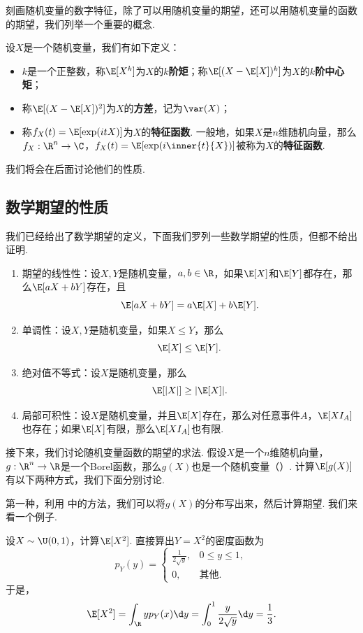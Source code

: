 刻画随机变量的数字特征，除了可以用随机变量的期望，还可以用随机变量的函数的期望，我们列举一个重要的概念. 

\begin{definition}[矩，方差，特征函数]
设$X$是一个随机变量，我们有如下定义：
\begin{itemize}
    \item $k$是一个正整数，称$\E[X^k]$为$X$的\textbf{$k$阶矩}；称$\E[(X-\E[X])^k]$为$X$的\textbf{$k$阶中心矩}；
    \item 称$\E[(X-\E[X])^2]$为$X$的\textbf{方差}，记为$\var(X)$；
    \item 称$f_X(t)=\E[\exp(i tX)]$为$X$的\textbf{特征函数}. 一般地，如果$X$是$n$维随机向量，那么$f_X:\R^n\to\C$，$f_X(t)=\E[\exp(i\inner{t}{X})]$被称为$X$的\textbf{特征函数}. 
\end{itemize}
\end{definition}
我们将会在后面讨论他们的性质. 

\subsection{数学期望的性质}

我们已经给出了数学期望的定义，下面我们罗列一些数学期望的性质，但都不给出证明. 

\begin{proposition}\label{prop:expectation-property}
\begin{enumerate}
\item 期望的线性性：设$X,Y$是随机变量，$a,b\in\R$，如果$\E[X]$和$\E[Y]$都存在，那么$\E[aX+bY]$存在，且
\[\E[aX+bY]=a\E[X]+b\E[Y].\]
\item 单调性：设$X,Y$是随机变量，如果$X\leq Y$，那么
\[\E[X]\leq \E[Y].\]
\item 绝对值不等式：设$X$是随机变量，那么
\[\E[|X|]\geq |\E[X]|.\]
\item 局部可积性：设$X$是随机变量，并且$\E[X]$存在，那么对任意事件$A$，$\E[XI_A]$也存在；如果$\E[X]$有限，那么$\E[XI_A]$也有限. 
\end{enumerate}
\end{proposition}

接下来，我们讨论随机变量函数的期望的求法. 假设$X$是一个$n$维随机向量，$g:\R^n\to\R$是一个Borel函数，那么$g(X)$也是一个随机变量（）. 计算$\E[g(X)]$有以下两种方式，我们下面分别讨论. 

第一种，利用 中的方法，我们可以将$g(X)$的分布写出来，然后计算期望. 我们来看一个例子. 

\begin{example}\label{ex:uniform-square}
设$X\sim\U(0,1)$，计算$\E[X^2]$. 直接算出$Y=X^2$的密度函数为
\[p_Y(y)=\begin{cases}
    \frac{1}{2\sqrt{y}},&0\leq y\leq 1,\\
    0,&\text{其他}.
\end{cases}\]
于是，
\[\E[X^2]=\int_{\R} y p_Y(x)\d y=\int_0^1\frac{y}{2\sqrt{y}}\d y=\frac{1}{3}.\]
\end{example}

